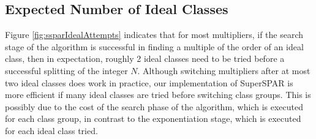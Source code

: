 \documentclass{ucalgthes1}
\theoremstyle{definition}
\begin{document}
\subsection{Expected Number of Ideal Classes}
\label{subsec:ssparExpIdeals}

Figure \ref{fig:ssparIdealAttempts} indicates that for most multipliers, if the search stage of the algorithm is successful in finding a multiple of the order of an ideal class, then in expectation, roughly 2 ideal classes need to be tried before a successful splitting of the integer $N$.  Although switching multipliers after at most two ideal classes does work in practice, our implementation of SuperSPAR is more efficient if many ideal classes are tried before switching class groups.  This is possibly due to the cost of the search phase of the algorithm, which is executed for each class group, in contrast to the exponentiation stage, which is executed for each ideal class tried.
\end{document}
